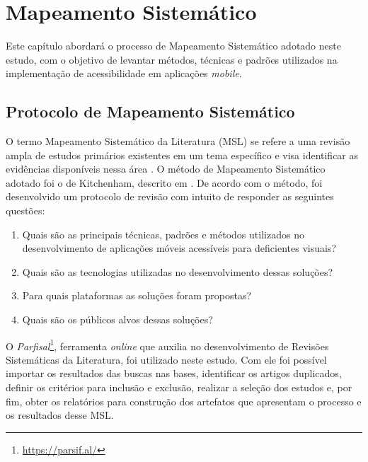 \chapter{Mapeamento Sistemático}
Este capítulo abordará o processo de Mapeamento Sistemático adotado neste estudo, com o objetivo de levantar métodos, técnicas e padrões utilizados na implementação de acessibilidade em aplicações \emph{mobile}.


\section{Protocolo de Mapeamento Sistemático}
O termo Mapeamento Sistemático da Literatura (MSL) se refere a uma revisão ampla de estudos primários existentes em um tema específico e visa identificar as evidências disponíveis nessa área \cite{Kitchenham2007}. O método de Mapeamento Sistemático adotado foi o de Kitchenham, descrito em . De acordo com o método, foi desenvolvido um protocolo de revisão com intuito de responder as seguintes questões:
\begin{enumerate}
\item Quais são as principais técnicas, padrões e métodos utilizados no desenvolvimento de aplicações móveis acessíveis para deficientes visuais?
\item Quais são as tecnologias utilizadas no desenvolvimento dessas soluções?
\item Para quais plataformas as soluções foram propostas?
\item Quais são os públicos alvos dessas soluções?
\end{enumerate}

O \emph{Parfisal}\footnote{\url{https://parsif.al/}}, ferramenta \emph{online} que auxilia no desenvolvimento de Revisões Sistemáticas da Literatura, foi utilizado neste estudo. Com ele foi possível importar os resultados das buscas nas bases, identificar os artigos duplicados, definir os critérios para inclusão e exclusão, realizar a seleção dos estudos e, por fim, obter os relatórios para construção dos artefatos que apresentam o processo e os resultados desse MSL.

